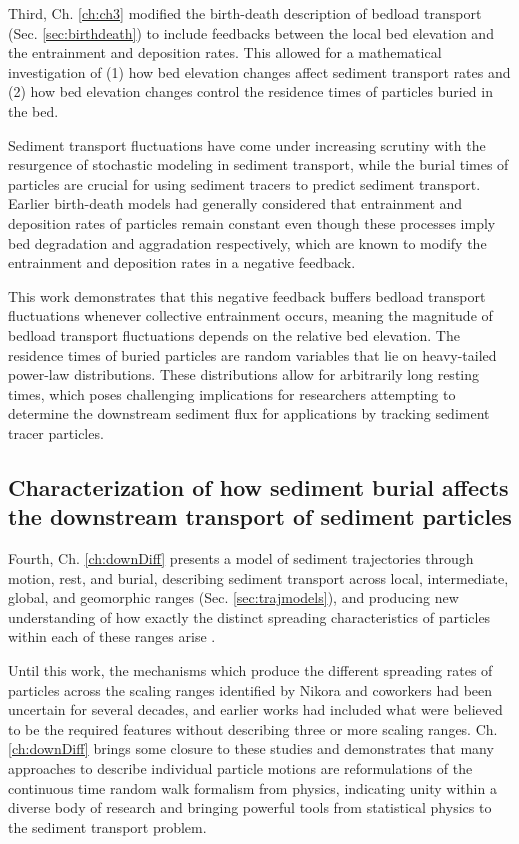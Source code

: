 Third, Ch. \ref{ch:ch3} modified the birth-death description of bedload transport (Sec. \ref{sec:birthdeath}) to include feedbacks between the local bed elevation and the entrainment and deposition rates.
This allowed for a mathematical investigation of (1) how bed elevation changes affect sediment transport rates and (2) how bed elevation changes control the residence times of particles buried in the bed.

Sediment transport fluctuations have come under increasing scrutiny with the resurgence of stochastic modeling in sediment transport, while the burial times of particles are crucial for using sediment tracers to predict sediment transport.
Earlier birth-death models had generally considered that entrainment and deposition rates of particles remain constant even though these processes imply bed degradation and aggradation respectively, which are known to modify the entrainment and deposition rates in a negative feedback.

This work demonstrates that this negative feedback buffers bedload transport fluctuations whenever collective entrainment occurs, meaning the magnitude of bedload transport fluctuations depends on the relative bed elevation. The residence times of buried particles are random variables that lie on heavy-tailed power-law distributions. These distributions allow for arbitrarily long resting times, which poses challenging implications for researchers attempting to determine the downstream sediment flux for applications by tracking sediment tracer particles. 

\subsection{Characterization of how sediment burial affects the downstream transport of sediment particles}

Fourth, Ch. \ref{ch:downDiff} presents a model of sediment trajectories through motion, rest, and burial, describing sediment transport across local, intermediate, global, and geomorphic ranges (Sec. \ref{sec:trajmodels}), and producing new understanding of how exactly the distinct spreading characteristics of particles within each of these ranges arise \citep[e.g][]{Pretzlav2021}.

Until this work, the mechanisms which produce the different spreading rates of particles across the scaling ranges identified by Nikora and coworkers had been uncertain for several decades, and earlier works had included what were believed to be the required features without describing three or more scaling ranges.
Ch. \ref{ch:downDiff} brings some closure to these studies and demonstrates that many approaches to describe individual particle motions are reformulations of the continuous time random walk formalism from physics, indicating unity within a diverse body of research and bringing powerful tools from statistical physics to the sediment transport problem.

